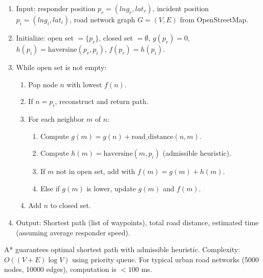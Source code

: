 \begin{enumerate}
  \item Input: responder position $p_r = (lng_r, lat_r)$, incident position $p_i = (lng_i, lat_i)$, road network graph $G = (V, E)$ from OpenStreetMap.
  \item Initialize: open set $= \{p_r\}$, closed set $= \emptyset$, $g(p_r) = 0$, $h(p_i) = \text{haversine}(p_r, p_i)$, $f(p_r) = h(p_i)$.
  \item While open set is not empty:
  \begin{enumerate}
    \item Pop node $n$ with lowest $f(n)$.
    \item If $n = p_i$, reconstruct and return path.
    \item For each neighbor $m$ of $n$:
    \begin{enumerate}
      \item Compute $g(m) = g(n) + \text{road\_distance}(n, m)$.
      \item Compute $h(m) = \text{haversine}(m, p_i)$ (admissible heuristic).
      \item If $m$ not in open set, add with $f(m) = g(m) + h(m)$.
      \item Else if $g(m)$ is lower, update $g(m)$ and $f(m)$.
    \end{enumerate}
    \item Add $n$ to closed set.
  \end{enumerate}
  \item Output: Shortest path (list of waypoints), total road distance, estimated time (assuming average responder speed).
\end{enumerate}

A* guarantees optimal shortest path with admissible heuristic. Complexity: $O((V + E) \log V)$ using priority queue. For typical urban road networks (5000 nodes, 10000 edges), computation is $< 100$ ms.
